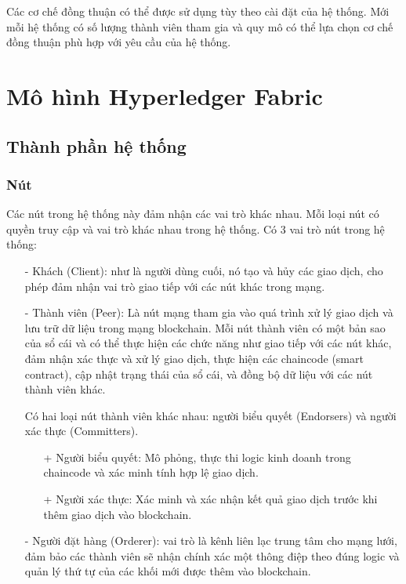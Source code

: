 Các cơ chế đồng thuận có thể được sử dụng tùy theo cài đặt của hệ thống. Mới mỗi hệ thống có 
số lượng thành viên tham gia và quy mô có thể lựa chọn cơ chế đồng thuận phù hợp với yêu cầu của hệ thống.

\section{Mô hình Hyperledger Fabric}
\subsection{Thành phần hệ thống}
\subsubsection{Nút}
Các nút trong hệ thống này đảm nhận các vai trò khác nhau. Mỗi loại nút có quyền truy cập và vai trò khác
nhau trong hệ thống.
Có 3 vai trò nút trong hệ thống:  
\begin{itemize}
    \item[-] Khách (Client): như là người dùng cuối, nó tạo và hủy
    các giao dịch, cho phép đảm nhận vai trò giao tiếp với các nút khác trong mạng.
    \item[-] Thành viên (Peer): Là nút mạng tham gia vào quá trình xử lý giao dịch và lưu trữ 
    dữ liệu trong mạng blockchain. Mỗi nút thành viên có một bản sao của sổ cái và có 
    thể thực hiện các chức năng như giao tiếp với các nút khác, đảm nhận xác thực và xử lý 
    giao dịch, thực hiện các chaincode (smart contract), cập nhật trạng thái của 
    sổ cái, và đồng bộ dữ liệu với các nút thành viên khác.
    
    Có hai loại nút thành viên khác nhau: người biểu quyết (Endorsers) và người xác thực (Committers).
        \begin{itemize}
            \item[+] Người biểu quyết: Mô phỏng, thực thi logic kinh doanh trong chaincode và xác minh tính hợp lệ giao dịch.
            \item[+] Người xác thực: Xác minh và xác nhận kết quả giao dịch trước khi thêm giao dịch vào blockchain. \cite{hyperledger1}
        \end{itemize}
    \item[-] Người đặt hàng (Orderer): vai trò là kênh liên lạc trung tâm cho mạng lưới, 
    đảm bảo các thành viên sẽ nhận chính 
    xác một thông điệp theo đúng logic và quản lý thứ tự của các 
    khối mới được thêm vào blockchain.
    
\end{itemize}
